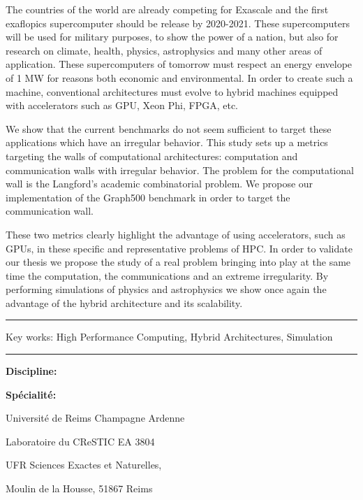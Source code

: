 The countries of the world are already competing for Exascale and the first exaflopics supercomputer should be release by 2020-2021.
These supercomputers will be used for military purposes, to show the power of a nation, but also for research on climate, health, physics, astrophysics and many other areas of application.
These supercomputers of tomorrow must respect an energy envelope of 1 MW for reasons both economic and environmental.
In order to create such a machine, conventional architectures must evolve to hybrid machines equipped with accelerators such as GPU, Xeon Phi, FPGA, etc.

We show that the current benchmarks do not seem sufficient to target these applications which have an irregular behavior.
This study sets up a metrics targeting the walls of computational architectures: computation and communication walls with irregular behavior.
The problem for the computational wall is the Langford's academic combinatorial problem.
We propose our implementation of the Graph500 benchmark in order to target the communication wall.

These two metrics clearly highlight the advantage of using accelerators, such as GPUs, in these specific and representative problems of HPC.
In order to validate our thesis we propose the study of a real problem bringing into play at the same time the computation, the communications and an extreme irregularity.
By performing simulations of physics and astrophysics we show once again the advantage of the hybrid architecture and its scalability.

\vspace{.3cm}
\hrule
\vspace{.1cm}

{
\small
Key works: High Performance Computing, Hybrid Architectures, Simulation
}

\vspace{.1cm}
\hrule

\vspace{.3cm}
\textbf{Discipline: \phdDiscipline}

\textbf{Spécialité: \phdSpeciality}
\vspace{.2cm}

\hspace{8cm}Université de Reims Champagne Ardenne

\hspace{8cm}Laboratoire du CReSTIC EA 3804

\hspace{8cm}UFR Sciences Exactes et Naturelles, 

\hspace{8cm}Moulin de la Housse, 51867 Reims

